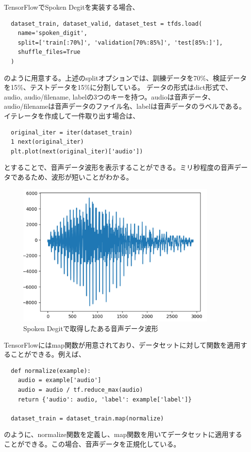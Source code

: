 \documentclass{ltjsarticle}
\begin{document}
TensorFlowでSpoken Degitを実装する場合、
\begin{itembox}[l]{}
\begin{verbatim}
  dataset_train, dataset_valid, dataset_test = tfds.load(
    name='spoken_digit',
    split=['train[:70%]', 'validation[70%:85%]', 'test[85%:]'],
    shuffle_files=True
  )
\end{verbatim}
\end{itembox}
のように用意する。上述のsplitオプションでは、訓練データを70\%、検証データを15\%、テストデータを15\%に分割している。
データの形式はdict形式で、audio, audio/filename, labelの3つのキーを持つ。audioは音声データ、audio/filenameは音声データのファイル名、labelは音声データのラベルである。
イテレータを作成して一件取り出す場合は、
\begin{itembox}[l]{}
\begin{verbatim}
  original_iter = iter(dataset_train)
  1 next(original_iter)
  plt.plot(next(original_iter)['audio'])
\end{verbatim}
\end{itembox}
とすることで、音声データ波形を表示することができる。ミリ秒程度の音声データであるため、波形が短いことがわかる。
\begin{figure}
  \centering
  \includegraphics[width=10cm]{./capture/spoken_digit_1.png}
  \caption{Spoken Degitで取得したある音声データ波形}
  \label{fig:Spoken_Degit}
\end{figure}

TensorFlowにはmap関数が用意されており、データセットに対して関数を適用することができる。例えば、
\begin{itembox}[l]{}
\begin{verbatim}
  def normalize(example):
    audio = example['audio']
    audio = audio / tf.reduce_max(audio)
    return {'audio': audio, 'label': example['label']}

  dataset_train = dataset_train.map(normalize)
\end{verbatim}
\end{itembox}
のように、normalize関数を定義し、map関数を用いてデータセットに適用することができる。この場合、音声データを正規化している。
\end{document}
